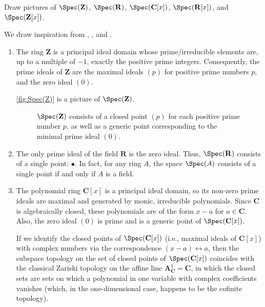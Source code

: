 \begin{exercise}
Draw pictures of \(\Spec(\mathbf Z)\), \(\Spec(\mathbf R)\), \(\Spec(\mathbf C[x])\), \(\Spec(\mathbf R[x])\), and \(\Spec(\mathbf Z[x])\).
\end{exercise}

\begin{solution}
We draw inspiration from \cite[Chapter~II]{EisenbudHarrisGeometryOfSchemes},  \cite[Chapter~II,~\S1]{MumfordRedBook}, and \cite[Chapter~3]{VakilNotes}.

\begin{enumerate}
\item
The ring \(\mathbf{Z}\) is a principal ideal domain whose prime/irreducible elements are, up to a multiple of \(-1\), exactly the positive prime integers.
Consequently, the prime ideals of \(\mathbf{Z}\) are the maximal ideals \((p)\) for positive prime numbers \(p\), and the zero ideal \((0)\).

\autoref{fig:Spec(Z)} is a picture of \(\Spec(\mathbf{Z})\).

\begin{figure}
\centering

\caption{%
\(\Spec(\mathbf{Z})\) consists of a closed point \((p)\) for each positive prime number \(p\), as well as a generic point corresponding to the minimal prime ideal \((0)\).%
}
\label{fig:Spec(Z)}
\end{figure}

\item
The only prime ideal of the field \(\mathbf{R}\) is the zero ideal.
Thus, \(\Spec(\mathbf{R})\) consists of a single point: \(\bullet\).
In fact, for any ring \(A\), the space \(\Spec(A)\) consists of a single point if and only if \(A\) is a field.
\item
The polynomial ring \(\mathbf{C}[x]\) is a principal ideal domain, so its non-zero prime ideals are maximal and generated by monic, irreducible polynomials.
Since \(\mathbf{C}\) is algebraically closed, these polynomials are of the form \(x - a\) for \(a \in \mathbf{C}\).
Also, the zero ideal \((0)\) is prime and is a generic point of \(\Spec(\mathbf{C}[x])\).

If we identify the closed points of \(\Spec(\mathbf{C}[x])\) (i.e., maximal ideals of \(\mathbf{C}[x]\)) with complex numbers via the correspondence \((x - a) \leftrightarrow a\), then the subspace topology on the set of closed points of \(\Spec(\mathbf{C}[x])\) coincides with the classical Zariski topology on the affine line \(\mathbf{A}_{\mathbf{C}}^1 = \mathbf{C}\), in which the closed sets are sets on which a polynomial in one variable with complex coefficients vanishes (which, in the one-dimensional case, happens to be the cofinite topology).


\end{enumerate}
\end{solution}
